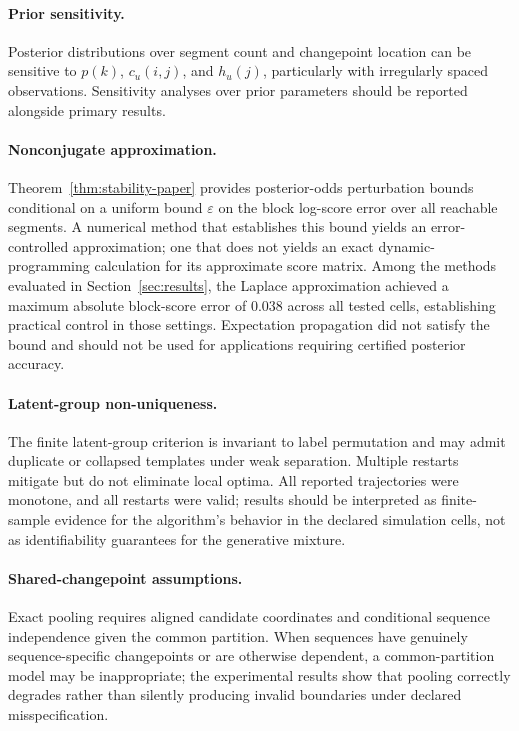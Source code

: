 \paragraph{Prior sensitivity.}
Posterior distributions over segment count and changepoint location can be sensitive to $p(k)$, $c_u(i,j)$, and $h_u(j)$, particularly with irregularly spaced observations. Sensitivity analyses over prior parameters should be reported alongside primary results.

\paragraph{Nonconjugate approximation.}
Theorem~\ref{thm:stability-paper} provides posterior-odds perturbation bounds conditional on a uniform bound $\varepsilon$ on the block log-score error over all reachable segments. A numerical method that establishes this bound yields an error-controlled approximation; one that does not yields an exact dynamic-programming calculation for its approximate score matrix. Among the methods evaluated in Section~\ref{sec:results}, the Laplace approximation achieved a maximum absolute block-score error of $0.038$ across all tested cells, establishing practical control in those settings. Expectation propagation did not satisfy the bound and should not be used for applications requiring certified posterior accuracy.

\paragraph{Latent-group non-uniqueness.}
The finite latent-group criterion is invariant to label permutation and may admit duplicate or collapsed templates under weak separation. Multiple restarts mitigate but do not eliminate local optima. All reported trajectories were monotone, and all restarts were valid; results should be interpreted as finite-sample evidence for the algorithm's behavior in the declared simulation cells, not as identifiability guarantees for the generative mixture.

\paragraph{Shared-changepoint assumptions.}
Exact pooling requires aligned candidate coordinates and conditional sequence independence given the common partition. When sequences have genuinely sequence-specific changepoints or are otherwise dependent, a common-partition model may be inappropriate; the experimental results show that pooling correctly degrades rather than silently producing invalid boundaries under declared misspecification.

